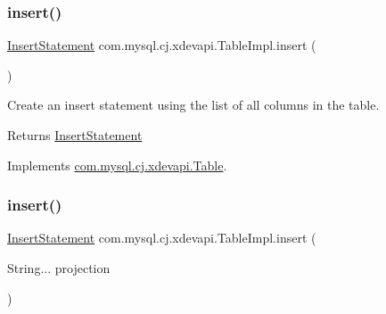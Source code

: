\mbox{\label{classcom_1_1mysql_1_1cj_1_1xdevapi_1_1_table_impl_a1da24c004f76d313383111cb4f250a3c}} 
\subsubsection{\texorpdfstring{insert()}{insert()}\hspace{0.1cm}{\footnotesize\ttfamily [1/3]}}
{\footnotesize\ttfamily \mbox{\hyperlink{interfacecom_1_1mysql_1_1cj_1_1xdevapi_1_1_insert_statement}{Insert\+Statement}} com.\+mysql.\+cj.\+xdevapi.\+Table\+Impl.\+insert (\begin{DoxyParamCaption}{ }\end{DoxyParamCaption})}

Create an insert statement using the list of all columns in the table.

\begin{DoxyReturn}{Returns}
\mbox{\hyperlink{interfacecom_1_1mysql_1_1cj_1_1xdevapi_1_1_insert_statement}{Insert\+Statement}} 
\end{DoxyReturn}


Implements \mbox{\hyperlink{interfacecom_1_1mysql_1_1cj_1_1xdevapi_1_1_table_ae9faedd85539146509fa68982fc346f9}{com.\+mysql.\+cj.\+xdevapi.\+Table}}.

\mbox{\label{classcom_1_1mysql_1_1cj_1_1xdevapi_1_1_table_impl_a6ead605c582f7e5d5e95c0704a17686a}} 
\subsubsection{\texorpdfstring{insert()}{insert()}\hspace{0.1cm}{\footnotesize\ttfamily [2/3]}}
{\footnotesize\ttfamily \mbox{\hyperlink{interfacecom_1_1mysql_1_1cj_1_1xdevapi_1_1_insert_statement}{Insert\+Statement}} com.\+mysql.\+cj.\+xdevapi.\+Table\+Impl.\+insert (\begin{DoxyParamCaption}\item[{String...}]{projection }\end{DoxyParamCaption})}

